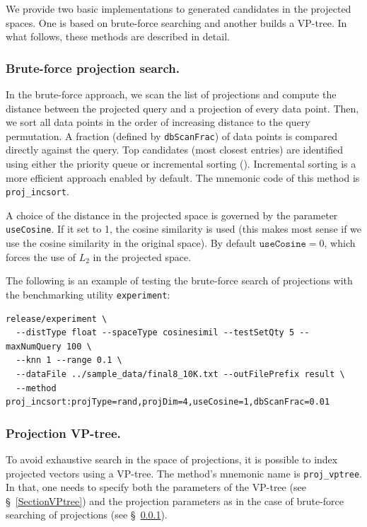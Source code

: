\documentclass[runningheads,a4paper]{llncs}
\newcommand{\ttt}[1]{\texttt{#1}}
\begin{document}
{We provide two basic implementations to generated candidates in the projected spaces.
One is based on brute-force searching and another builds a VP-tree.
In what follows, these methods are described in detail.

\subsubsection{Brute-force projection search.}\label{SectionProjBruteForce}
In the brute-force approach, we scan the list of projections and compute the distance
between the projected query and a projection of every data point.
Then, we sort all data points in the order of increasing distance to the query permutation.
A fraction (defined by \ttt{dbScanFrac}) of data points is compared directly against the query.
Top candidates (most closest entries) are identified using either the priority queue
or incremental sorting (\cite{Chavez2008incsort}). 
Incremental sorting is a more efficient approach enabled by default.
The mnemonic code of this method is \ttt{proj\_incsort}.

A choice of the distance in the projected space is governed by the parameter \ttt{useCosine}.
If it set to 1, the cosine similarity is used (this makes most sense if we use the cosine similarity
in the original space). By default $\ttt{useCosine}=0$, which forces the use of $L_2$ in the projected space. 

The following is an example of testing the brute-force search of projections with the benchmarking utility \ttt{experiment}:
{
\footnotesize
\begin{verbatim}
release/experiment \
  --distType float --spaceType cosinesimil --testSetQty 5 --maxNumQuery 100 \
  --knn 1 --range 0.1 \
  --dataFile ../sample_data/final8_10K.txt --outFilePrefix result \
  --method proj_incsort:projType=rand,projDim=4,useCosine=1,dbScanFrac=0.01
\end{verbatim}
}

\subsubsection{Projection VP-tree.}\label{SectionProjVPTree}
To avoid exhaustive search in the space of projections, 
it is possible to index projected vectors using a VP-tree.
The method's mnemonic name is \ttt{proj\_vptree}.
In that, one needs to specify both the parameters of the VP-tree  (see \S~\ref{SectionVPtree})
and the projection parameters as in the case of brute-force searching of projections (see \S~\ref{SectionProjBruteForce}). 

}
\end{document}
